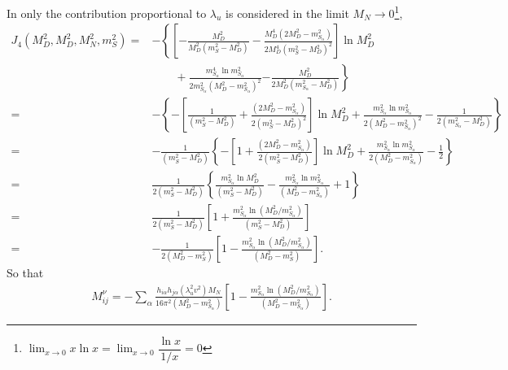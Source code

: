 In  \cite{Fraser:2014yha} only the contribution proportional to $\lambda_u$ is considered in the limit $M_N\to 0$\footnote{$\lim_{x\to 0}x\ln x=\lim_{x\to 0}\dfrac{\ln x}{1/x}=0$}, 
\begin{align*}
   J_4\left(M_D^2,M_D^2,M_N^2,m^2_{S}  \right)=&
-\left\{  \left[-\frac{M_D^2}{M_D^2\left(m_{S}^2-M_D^2\right)} 
-\frac{M_D^4 \left(2M_D^2-m_{S_\alpha}^2\right)}{2M_D^4\left(m_{S}^2-M_D^2\right)^2} \right]\ln M_D^2\right.\nonumber\\
&\qquad+\frac{m_{S_\alpha}^4\ln m_{S_\alpha}^2}{2m_{S_\alpha}^2\left( M_D^2-m_{S_\alpha}^2 \right)^2} 
\left.-\frac{M_D^2}{2M_D^2\left(m_{S_\alpha}^2-M_D^2  \right)} \right\}\nonumber\\
=&  -\left\{  -\left[\frac{1}{\left(m_{S}^2-M_D^2\right)} 
+\frac{\left(2M_D^2-m_{S_\alpha}^2\right)}{2\left(m_{S}^2-M_D^2\right)^2} \right]\ln M_D^2
+\frac{m_{S_\alpha}^2\ln m_{S_\alpha}^2}{2\left( M_D^2-m_{S_\alpha}^2 \right)^2} 
-\frac{1}{2\left(m_{S_\alpha}^2-M_D^2  \right)} \right\}\nonumber\\
=&  -\frac{1}{\left(m_{S}^2-M_D^2\right)}\left\{  -\left[1 
+\frac{\left(2M_D^2-m_{S_\alpha}^2\right)}{2\left(m_{S}^2-M_D^2\right)} \right]\ln M_D^2
+\frac{m_{S_\alpha}^2\ln m_{S_\alpha}^2}{2\left( M_D^2-m_{S_\alpha}^2 \right)} 
-\frac{1}{2} \right\}\nonumber\\
= & \frac{1}{2\left(m_{S}^2-M_D^2\right)}\left\{  \frac{m_{S_\alpha}^2\ln M_D^2}{\left(m_{S}^2-M_D^2\right)}
-\frac{m_{S_\alpha}^2\ln m_{S_\alpha}^2}{\left( M_D^2-m_{S_\alpha}^2 \right)} +1 \right\}\nonumber\\
=&  \frac{1}{2\left(m_{S}^2-M_D^2\right)}\left[ 1+ \frac{m_{S_\alpha}^2\ln \left( M_D^2/m_{S_\alpha}^2 \right)}{\left(m_{S}^2-M_D^2\right)}
\right]\nonumber\\
=& - \frac{1}{2\left(M_D^2-m_{S}^2\right)}\left[ 1-\frac{m_{S_\alpha}^2\ln \left( M_D^2/m_{S_\alpha}^2 \right)}{\left(M_D^2-m_{S}^2\right)}
\right].
\end{align*}
So that
\begin{align*}
M^{\nu}_{ij}=-\sum_{\alpha}\frac{h_{i\alpha}h_{j\alpha}\left(\lambda_u^2 v^2\right)M_N}{16\pi^2\left(M_D^2-m_{S_\alpha}^2\right)}
\left[ 1-\frac{m_{S_\alpha}^2\ln \left( M_D^2/m_{S_\alpha}^2 \right)}{\left(M_D^2-m_{S_\alpha}^2\right)}\right].
\end{align*}






